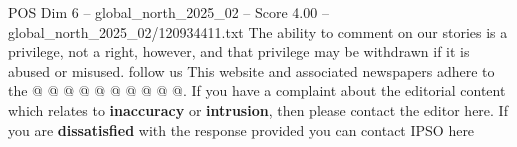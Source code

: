 \begin{textsample}{POS Dim 6 – global\_north\_2025\_02 – Score 4.00 – global\_north\_2025\_02/120934411.txt}
The ability to comment on our stories is a privilege, not a right, however, and that privilege may be withdrawn if it is abused or misused. follow us This website and associated newspapers adhere to the @ @ @ @ @ @ @ @ @ @.
If you have a complaint about the editorial content which relates to \textbf{inaccuracy} or \textbf{intrusion}, then please contact the editor here.
If you are \textbf{dissatisfied} with the response provided you can contact IPSO here

\end{textsample}
